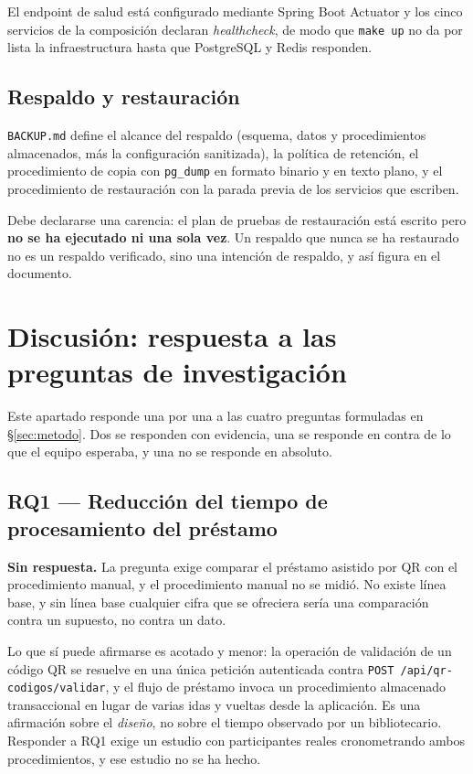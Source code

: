 \documentclass[11pt,a4paper]{article}
\begin{document}
El endpoint de salud está configurado mediante Spring Boot Actuator y los cinco
servicios de la composición declaran \emph{healthcheck}, de modo que
\texttt{make up} no da por lista la infraestructura hasta que PostgreSQL y Redis
responden.

\subsection{Respaldo y restauración}

\texttt{BACKUP.md} define el alcance del respaldo (esquema, datos y
procedimientos almacenados, más la configuración sanitizada), la política de
retención, el procedimiento de copia con \texttt{pg\_dump} en formato binario y
en texto plano, y el procedimiento de restauración con la parada previa de los
servicios que escriben.

Debe declararse una carencia: el plan de pruebas de restauración está escrito
pero \textbf{no se ha ejecutado ni una sola vez}. Un respaldo que nunca se ha
restaurado no es un respaldo verificado, sino una intención de respaldo, y así
figura en el documento.

\section{Discusión: respuesta a las preguntas de investigación}\label{sec:discusion}

Este apartado responde una por una a las cuatro preguntas formuladas en
§\ref{sec:metodo}. Dos se responden con evidencia, una se responde en contra de
lo que el equipo esperaba, y una no se responde en absoluto.

\subsection{RQ1 --- Reducción del tiempo de procesamiento del préstamo}

\textbf{Sin respuesta.} La pregunta exige comparar el préstamo asistido por QR
con el procedimiento manual, y el procedimiento manual no se midió. No existe
línea base, y sin línea base cualquier cifra que se ofreciera sería una
comparación contra un supuesto, no contra un dato.

Lo que sí puede afirmarse es acotado y menor: la operación de validación de un
código QR se resuelve en una única petición autenticada contra
\texttt{POST /api/qr-codigos/validar}, y el flujo de préstamo invoca un
procedimiento almacenado transaccional en lugar de varias idas y vueltas desde
la aplicación. Es una afirmación sobre el \emph{diseño}, no sobre el tiempo
observado por un bibliotecario. Responder a RQ1 exige un estudio con
participantes reales cronometrando ambos procedimientos, y ese estudio no se ha
hecho.
\end{document}
